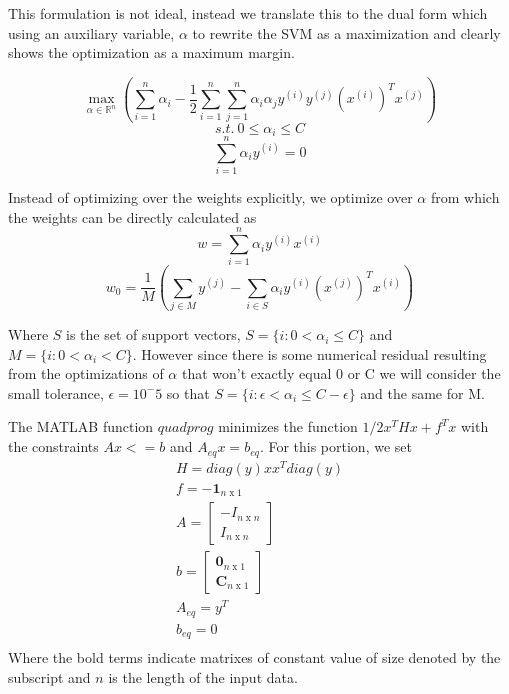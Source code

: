 \documentclass[10pt,twocolumn]{article}
\begin{document}
    
This formulation is not ideal, instead we translate this to the dual form which using an auxiliary variable, $\alpha$ to rewrite the SVM as a maximization and clearly shows the optimization as a maximum margin. 

\begin{equation}
\max_{\alpha \in \mathbb{R}^n} ( \sum_{i=1}^n \alpha_i - \frac{1}{2} \sum_{i=1}^n \sum_{j=1}^n \alpha_i \alpha_j y^{(i)} y^{(j)} (x^{(i)})^T x^{(j)})
\end{equation}
\begin{equation}
s.t. \: 0 \leq \alpha_i \leq C
\end{equation}
\begin{equation}
\sum_{i=1}^n \alpha_i y^{(i)} =0
\end{equation}

Instead of optimizing over the weights explicitly, we optimize over $\alpha$ from which the weights can be directly calculated as 
\begin{equation}
w= \sum_{i=1}^n \alpha_i y^{(i)}x^{(i)}
\end{equation}  
\begin{equation}
w_0= \frac{1}{M} ( \sum_{j \in M} y^{(j)} - \sum_{i \in S} \alpha_i y^{(i)}(x^{(j)})^Tx^{(i)})
\end{equation}

Where $S$ is the set of support vectors, $S=\{i : 0 < \alpha_i \leq C \}$ and $M = \{i : 0 < \alpha_i < C \}$. However since there is some numerical residual resulting from the optimizations of $\alpha$ that won't exactly equal 0 or C we will consider the small tolerance, $\epsilon= 10^-5$ so that  $S=\{i : \epsilon < \alpha_i \leq C-\epsilon \}$ and the same for M.

The MATLAB function $quadprog$ minimizes the function $1/2 x^T H x + f^T x$ with the constraints $Ax <= b$ and $A_{eq}x = b_{eq}$. For this portion, we set 
\begin{gather*}
H = diag(y)xx^Tdiag(y)\\
f = -\mathbf{1} _{n \; \textrm{x} \; 1}\\
A = \begin{bmatrix}-I_{n \; \textrm{x} \; n} \\ I_{n \; \textrm{x} \; n} \end{bmatrix}\\
b = \begin{bmatrix}  \mathbf{0} _{n \; \textrm{x} \; 1}\\  \mathbf{C} _{n \; \textrm{x} \; 1} \end{bmatrix}\\
A_{eq} = y^T\\
b_{eq} = 0\\
\end{gather*}
Where the bold terms indicate matrixes of constant value of size denoted by the subscript and $n$ is the length of the input data. 
\end{document}

